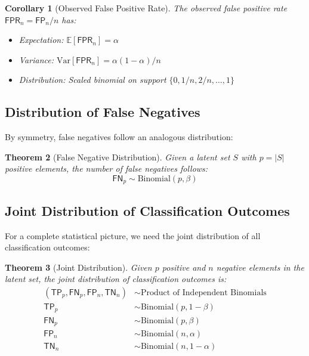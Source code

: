\documentclass[11pt,final,hidelinks]{article}
\newtheorem{theorem}{Theorem}[section]
\newtheorem{corollary}[theorem]{Corollary}
\newcommand{\Card}[1]{\lvert#1\rvert}
\newcommand{\Expect}[1]{\mathbb{E}\left[#1\right]}
\newcommand{\Var}[1]{\mathrm{Var}\left[#1\right]}
\newcommand{\FP}{\mathsf{FP}}  %
\newcommand{\FN}{\mathsf{FN}}  %
\newcommand{\TP}{\mathsf{TP}}  %
\newcommand{\TN}{\mathsf{TN}}  %
\newcommand{\FPR}{\mathsf{FPR}}  %
\newcommand{\fprate}{\alpha}
\newcommand{\fnrate}{\beta}
\newcommand{\Binomial}[2]{\mathrm{Binomial}(#1, #2)}
\begin{document}
\begin{corollary}[Observed False Positive Rate]
The observed false positive rate $\FPR_n = \FP_n/n$ has:
\begin{itemize}
    \item Expectation: $\Expect{\FPR_n} = \fprate$
    \item Variance: $\Var{\FPR_n} = \fprate(1-\fprate)/n$
    \item Distribution: Scaled binomial on support $\{0, 1/n, 2/n, \ldots, 1\}$
\end{itemize}
\end{corollary}

\subsection{Distribution of False Negatives}

By symmetry, false negatives follow an analogous distribution:

\begin{theorem}[False Negative Distribution]
Given a latent set $S$ with $p = \Card{S}$ positive elements, the number of false negatives follows:
\begin{equation}
\FN_p \sim \Binomial{p}{\fnrate}
\end{equation}
\end{theorem}

\subsection{Joint Distribution of Classification Outcomes}

For a complete statistical picture, we need the joint distribution of all classification outcomes:

\begin{theorem}[Joint Distribution]
Given $p$ positive and $n$ negative elements in the latent set, the joint distribution of classification outcomes is:
\begin{align}
(\TP_p, \FN_p, \FP_n, \TN_n) &\sim \text{Product of Independent Binomials} \\
\TP_p &\sim \Binomial{p}{1-\fnrate} \\
\FN_p &\sim \Binomial{p}{\fnrate} \\
\FP_n &\sim \Binomial{n}{\fprate} \\
\TN_n &\sim \Binomial{n}{1-\fprate}
\end{align}
\end{theorem}
\end{document}
